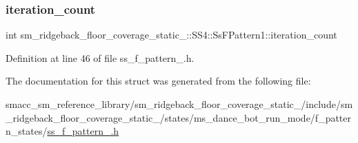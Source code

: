 \subsubsection{\texorpdfstring{iteration\+\_\+count}{iteration\_count}}
{\footnotesize\ttfamily int sm\+\_\+ridgeback\+\_\+floor\+\_\+coverage\+\_\+static\+\_\+::\+S\+S4\+::\+Ss\+F\+Pattern1\+::iteration\+\_\+count}



Definition at line 46 of file ss\+\_\+f\+\_\+pattern\+\_.\+h.



The documentation for this struct was generated from the following file\+:\begin{DoxyCompactItemize}
\item 
smacc\+\_\+sm\+\_\+reference\+\_\+library/sm\+\_\+ridgeback\+\_\+floor\+\_\+coverage\+\_\+static\+\_/include/sm\+\_\+ridgeback\+\_\+floor\+\_\+coverage\+\_\+static\+\_/states/ms\+\_\+dance\+\_\+bot\+\_\+run\+\_\+mode/f\+\_\+pattern\+\_\+states/\hyperlink{sm__ridgeback__floor__coverage__static__1_2include_2sm__ridgeback__floor__coverage__static__1_2sef47342a2bdbaa835adb6637c605f7b6}{ss\+\_\+f\+\_\+pattern\+\_.\+h}\end{DoxyCompactItemize}
